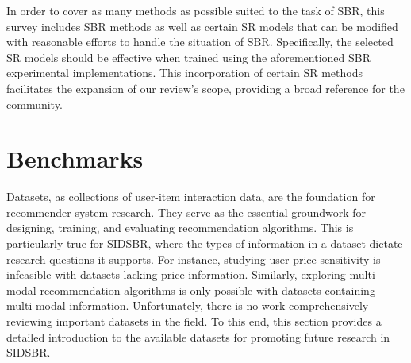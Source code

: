 \documentclass[lettersize,journal]{IEEEtran}
\newcommand{\baby}{{SIDSBR}\xspace}
\begin{document}
In order to cover as many methods as possible suited to the task of SBR, this survey includes SBR methods as well as certain SR models that can be modified with reasonable efforts to handle the situation of SBR. Specifically, the selected SR models should be effective when trained using the aforementioned SBR experimental implementations. This incorporation of certain SR methods facilitates the expansion of our review's scope, providing a broad reference for the community.

\section{Benchmarks}\label{benchmark}
Datasets, as collections of user-item interaction data, are the foundation for recommender system research. They serve as the essential groundwork for designing, training, and evaluating recommendation algorithms. This is particularly true for \baby, where the types of information in a dataset dictate research questions it supports. For instance, studying user price sensitivity is infeasible with datasets lacking price information. Similarly, exploring multi-modal recommendation algorithms is only possible with datasets containing multi-modal information. Unfortunately, there is no work comprehensively reviewing important datasets in the field. To this end, this section provides a detailed introduction to the available datasets for promoting future research in \baby.
\end{document}
